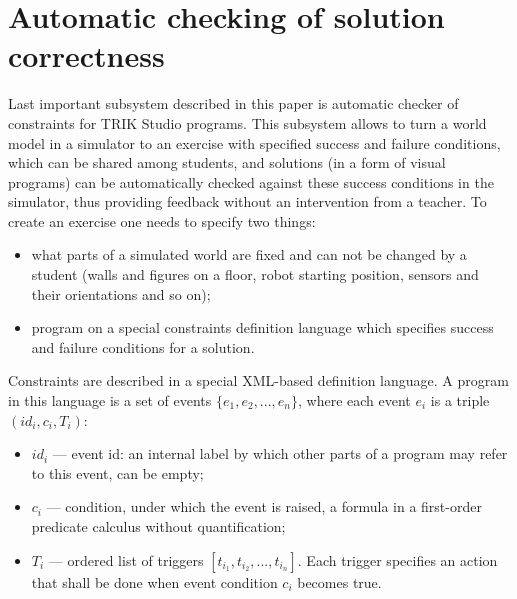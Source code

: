 \documentclass[conference]{IEEEtran}
\begin{document}
\section{Automatic checking of solution correctness}
\label{chapter:constraintsChecker}

Last important subsystem described in this paper is automatic checker of constraints for TRIK Studio programs. This subsystem allows to turn a world model in a simulator to an exercise with specified success and failure conditions, which can be shared among students, and solutions (in a form of visual programs) can be automatically checked against these success conditions in the simulator, thus providing feedback without an intervention from a teacher. To create an exercise one needs to specify two things:

\begin{itemize}
    \item what parts of a simulated world are fixed and can not be changed by a student (walls and figures on a floor, robot starting position, sensors and their orientations and so on);
    \item program on a special constraints definition language which specifies success and failure conditions for a solution.
\end{itemize}

Constraints are described in a special XML-based definition language. A program in this language is a set of events $\{ e_1, e_2, ..., e_n \}$, where each event $e_i$ is a triple $(id_i, c_i, T_i)$:

\begin{itemize}
    \item $id_i$ --- event id: an internal label by which other parts of a program may refer to this event, can be empty;
    \item $c_i$ --- condition, under which the event is raised, a formula in a first-order predicate calculus without quantification;
    \item $T_i$ --- ordered list of triggers $[ t_{i_1}, t_{i_2}, ..., t_{i_n} ]$. Each trigger specifies an action that shall be done when event condition $c_i$ becomes true.
\end{itemize}
\end{document}
